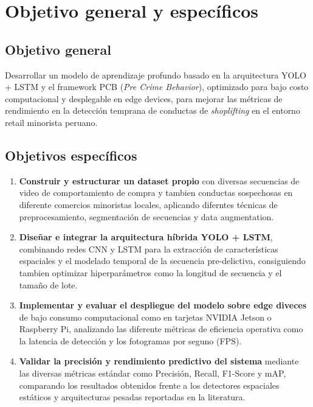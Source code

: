 	\section{Objetivo general y específicos}
	
	\subsection{Objetivo general}
	Desarrollar un modelo de aprendizaje profundo basado en la arquitectura YOLO + LSTM y el framework PCB (\textit{Pre Crime Behavior}), optimizado para bajo costo computacional y desplegable en edge devices, para mejorar las métricas de rendimiento en la detección temprana de conductas de \textit{shoplifting} en el entorno retail minorista peruano.
	
	\subsection{Objetivos específicos}

		\begin{enumerate}
			\item \textbf{Construir y estructurar un dataset propio} con diversas secuencias de video de comportamiento de compra y tambien conductas sospechosas en diferente comercios minoristas locales, aplicando diferntes técnicas de preprocesamiento, segmentación de secuencias y data augmentation.
			
			\item \textbf{Diseñar e integrar la arquitectura híbrida YOLO + LSTM}, combinando redes CNN y LSTM para la extracción de características espaciales y el modelado temporal de la secuencia pre-delictiva, consiguiendo tambien optimizar hiperparámetros como la longitud de secuencia y el tamaño de lote.
			
			\item \textbf{Implementar y evaluar el despliegue del modelo sobre edge diveces} de bajo consumo computacional como en tarjetas NVIDIA Jetson o Raspberry Pi, analizando las diferente métricas de eficiencia operativa como la latencia de detección y los fotogramas por seguno (FPS).
			
			\item \textbf{Validar la precisión y rendimiento predictivo del sistema} mediante las diversas métricas estándar como Precisión, Recall, F1-Score y mAP, comparando los resultados obtenidos frente a los detectores espaciales estáticos y arquitecturas pesadas reportadas en la literatura.
		\end{enumerate}
	

